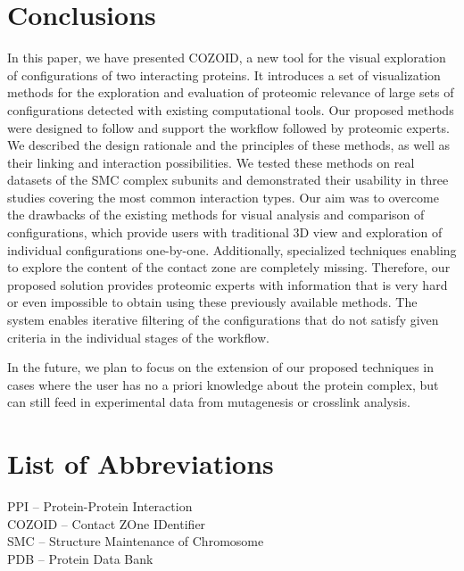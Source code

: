 \documentclass[twocolumn]{bmcart}%
\begin{document}
\section*{Conclusions}
In this paper, we have presented COZOID, a new tool for the visual exploration of configurations of two interacting proteins. 
It introduces a set of visualization methods for the exploration and evaluation of proteomic relevance of large sets of configurations detected with existing computational tools.
Our proposed methods were designed to follow and support the workflow followed by proteomic experts.
We described the design rationale and the principles of these methods, as well as their linking and interaction possibilities. 
We tested these methods on real datasets of the SMC complex subunits and demonstrated their usability in three studies covering the most common interaction types.
Our aim was to overcome the drawbacks of the existing methods for visual analysis and comparison of configurations, which provide users with traditional 3D view and exploration of individual configurations one-by-one.
Additionally, specialized techniques enabling to explore the content of the contact zone are completely missing. 
Therefore, our proposed solution provides proteomic experts with information that is very hard or even impossible to obtain using these previously available methods.
The system enables iterative filtering of the configurations that do not satisfy given criteria in the individual stages of the workflow.

In the future, we plan to focus on the extension of our proposed techniques in cases where the user has no a priori knowledge about the protein complex, but can still feed in experimental data from mutagenesis or crosslink analysis.


\section*{List of Abbreviations}
\begin{backmatter}
PPI -- Protein-Protein Interaction \\
COZOID -- Contact ZOne IDentifier \\
SMC -- Structure Maintenance of Chromosome \\
PDB -- Protein Data Bank \\
\end{backmatter}
\end{document}
